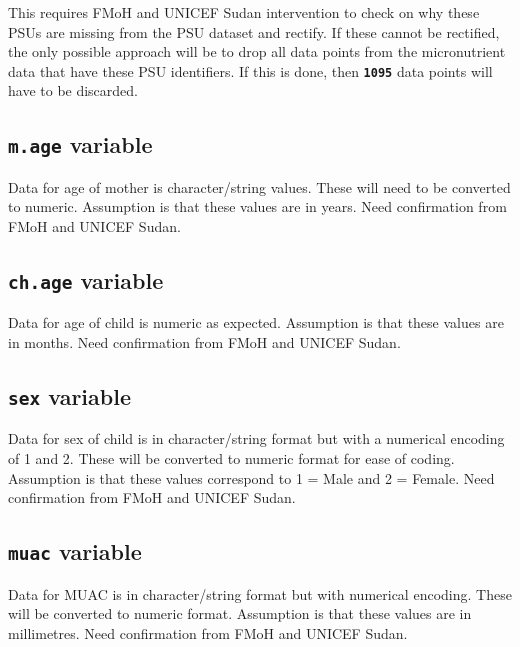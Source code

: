 \documentclass[12pt,a4paper]{article}
\begin{document}
This requires FMoH and UNICEF Sudan intervention to check on why these PSUs are missing from the PSU dataset and rectify. If these cannot be rectified, the only possible approach will be to drop all data points from the micronutrient data that have these PSU identifiers. If this is done, then \textbf{\texttt{1095}} data points will have to be discarded.

\hypertarget{m.age-variable}{%
\subsection{\texorpdfstring{\texttt{m.age} variable}{m.age variable}}\label{m.age-variable}}

Data for age of mother is character/string values. These will need to be converted to numeric. Assumption is that these values are in years. Need confirmation from FMoH and UNICEF Sudan.

\hypertarget{ch.age-variable}{%
\subsection{\texorpdfstring{\texttt{ch.age} variable}{ch.age variable}}\label{ch.age-variable}}

Data for age of child is numeric as expected. Assumption is that these values are in months. Need confirmation from FMoH and UNICEF Sudan.

\hypertarget{sex-variable}{%
\subsection{\texorpdfstring{\texttt{sex} variable}{sex variable}}\label{sex-variable}}

Data for sex of child is in character/string format but with a numerical encoding of 1 and 2. These will be converted to numeric format for ease of coding. Assumption is that these values correspond to 1 = Male and 2 = Female. Need confirmation from FMoH and UNICEF Sudan.

\hypertarget{muac-variable}{%
\subsection{\texorpdfstring{\texttt{muac} variable}{muac variable}}\label{muac-variable}}

Data for MUAC is in character/string format but with numerical encoding. These will be converted to numeric format. Assumption is that these values are in millimetres. Need confirmation from FMoH and UNICEF Sudan.
\end{document}
